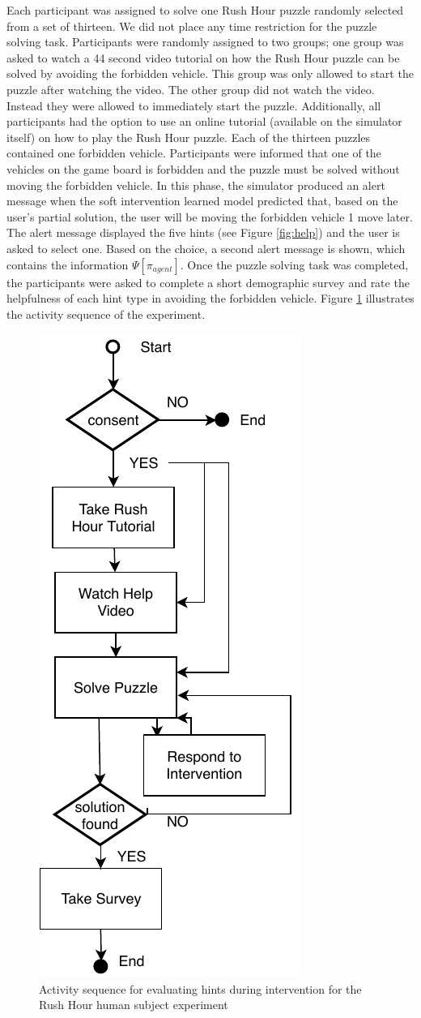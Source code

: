 \documentclass[doctor]{thesis} %
\theoremstyle{plain}
\begin{document}
Each participant was assigned to solve one Rush Hour puzzle randomly selected from a set of thirteen. We did not place any time restriction for the puzzle solving task. Participants were randomly assigned to two groups; one group was asked to watch a 44 second video tutorial on how the Rush Hour puzzle can be solved by avoiding the forbidden vehicle. This group was only allowed to start the puzzle after watching the video. The other group did not watch the video. Instead they were allowed to immediately start the puzzle. Additionally, all participants had the option to use an online tutorial (available on the simulator itself) on how to play the Rush Hour puzzle. Each of the thirteen puzzles contained one forbidden vehicle. Participants were informed that one of the vehicles on the game board is forbidden and the puzzle must be solved without moving the forbidden vehicle. In this phase, the simulator produced an alert message when the soft intervention learned model predicted that, based on the user's partial solution, the user will be moving the forbidden vehicle 1 move later. The alert message displayed the five hints (see Figure \ref{fig:help}) and the user is asked to select one. Based on the choice, a second alert message is shown, which contains the information $\Psi[\pi_{agent}]$. Once the puzzle solving task was completed, the participants were asked to complete a short demographic survey and rate the helpfulness of each hint type in avoiding the forbidden vehicle. Figure \ref{fig:phase2} illustrates the activity sequence of the experiment.

\begin{figure}[!htb]
  \centering
  \includegraphics[height=0.6\columnwidth]{img/phase2.pdf}
  \caption{Activity sequence for evaluating hints during intervention for the Rush Hour human subject experiment}
  \label{fig:phase2}
\end{figure}
\end{document}
